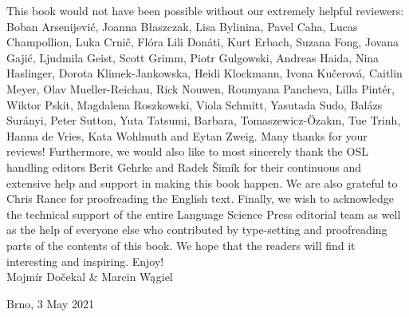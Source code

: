\documentclass[output=paper]{langscibook}
\begin{document}
This book would not have been possible without our extremely helpful reviewers: Boban Arsenijević, Joanna Błaszczak, Lisa Bylinina, Pavel Caha, Lucas Champollion, Luka Crnič, Flóra Lili Donáti, Kurt Erbach, Suzana Fong, Jovana Gajić, Ljudmila Geist, Scott Grimm, Piotr Gulgowski, Andreas Haida, Nina Haslinger, Dorota Klimek-Jankowska, Heidi Klockmann, Ivona Kučerová, Caitlin Meyer, Olav Mueller-Reichau, Rick Nouwen, Roumyana Pancheva, Lilla Pintér, Wiktor Pskit, Magdalena Roszkowski, Viola Schmitt, Yasutada Sudo, Balázs Surányi, Peter Sutton, Yuta Tatsumi, Barbara, Tomaszewicz-Özakın, Tue Trinh, Hanna de Vries, Kata Wohlmuth and Eytan Zweig. Many thanks for your reviews! Furthermore, we would also like to most sincerely thank the OSL handling editors Berit Gehrke and Radek Šimík for their continuous and extensive help and support in making this book happen. We are also grateful to Chris Rance for proofreading the English text. Finally, we wish to acknowledge the technical support of the entire Language Science Press editorial team as well as the help of everyone else who contributed by type-setting and proofreading parts of the contents of this book. We hope that the readers will find it interesting and inspiring. Enjoy!\bigskip\\

\hfill Mojmír Dočekal \& Marcin Wągiel

\hfill Brno, 3 May 2021

{\sloppy\printbibliography[heading=subbibliography,notkeyword=this]}
\end{document}
